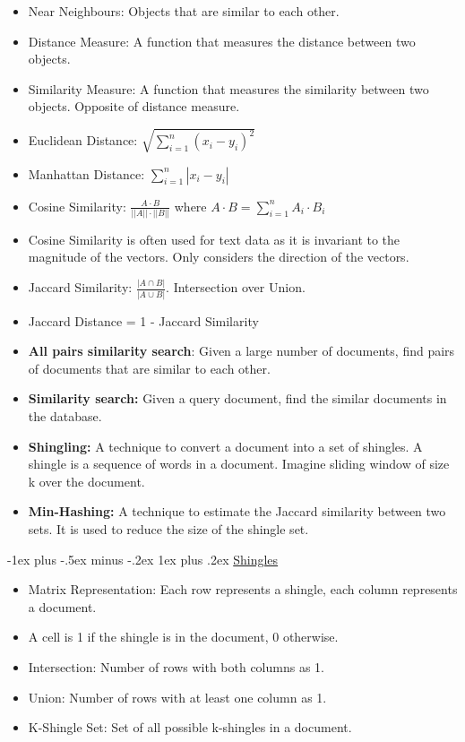\documentclass[10pt, landscape]{article}
\makeatletter
\renewcommand{\subsubsection}{\@startsection{subsubsection}{3}{0mm}%
  {-1ex plus -.5ex minus -.2ex}%
  {1ex plus .2ex}%
{\normalfont\small\bfseries}}%
\makeatother
\begin{document}
\begin{multicols*}{4}
  \begin{itemize}
    \item Near Neighbours: Objects that are similar to each other.
    \item Distance Measure: A function that measures the distance between two objects.
    \item Similarity Measure: A function that measures the similarity between two objects. Opposite of distance measure.
    \item Euclidean Distance: $\sqrt{\sum_{i=1}^{n} (x_i - y_i)^2}$
    \item Manhattan Distance: $\sum_{i=1}^{n} |x_i - y_i|$
    \item Cosine Similarity: $\frac{A \cdot B}{||A|| \cdot ||B||}$ where $A \cdot B = \sum_{i=1}^{n} A_i \cdot B_i$
    \item Cosine Similarity is often used for text data as it is invariant to the magnitude of the vectors. Only considers the direction of the vectors.
    \item Jaccard Similarity: $\frac{|A \cap B|}{|A \cup B|}$. Intersection over Union.
    \item Jaccard Distance = 1 - Jaccard Similarity
    \item \textbf{All pairs similarity search}: Given a large number of documents, find pairs of documents that are similar to each other.
    \item \textbf{Similarity search:} Given a query document, find the similar documents in the database.
    \item \textbf{Shingling:} A technique to convert a document into a set of shingles. A shingle is a sequence of words in a document. Imagine sliding window of size k over the document.
    \item \textbf{Min-Hashing:} A technique to estimate the Jaccard similarity between two sets. It is used to reduce the size of the shingle set.
  \end{itemize}

  \subsubsection{\underline{Shingles}}
  \begin{itemize}
    \item Matrix Representation: Each row represents a shingle, each column represents a document. 
    \item A cell is 1 if the shingle is in the document, 0 otherwise.
    \item Intersection: Number of rows with both columns as 1. 
    \item Union: Number of rows with at least one column as 1.
    \item K-Shingle Set: Set of all possible k-shingles in a document.
  \end{itemize}


\end{multicols*}
\end{document}
